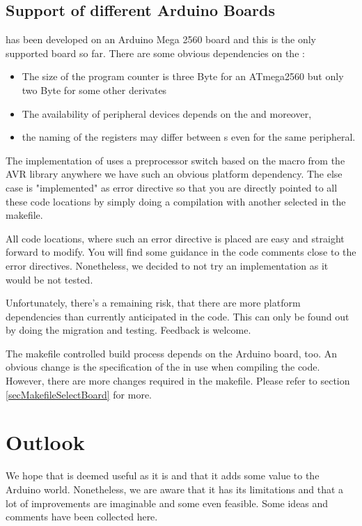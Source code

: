 \section{Support of different Arduino Boards}
\label{secArduinoBoards}

\rtos{} has been developed on an Arduino Mega 2560 board and this is the
only supported board so far. There are some obvious dependencies on the
\uC:
\begin{itemize}
  \item The size of the program counter is three Byte for an ATmega2560
    but only two Byte for some other derivates
  \item The availability of peripheral devices depends on the \uC{} and
    moreover,
  \item the naming of the registers may differ between \uC{}s even for the
    same peripheral.
\end{itemize}
The implementation of \rtos{} uses a preprocessor switch based on the
macro  from the AVR library anywhere we have
such an obvious platform dependency. The else case is "implemented" as
error directive so that you are directly pointed to all these code locations
by simply doing a compilation with another \uC{} selected in the makefile.

All code locations, where such an error directive is placed are easy and
straight forward to modify. You will find some guidance in the code
comments close to the error directives. Nonetheless, we decided to not try
an implementation as it would be not tested.

Unfortunately, there's a remaining risk, that there are more platform
dependencies than currently anticipated in the code. This can only be
found out by doing the migration and testing. Feedback is welcome.

The makefile controlled build process depends on the Arduino board, too.
An obvious change is the specification of the \uC{} in use when compiling
the code. However, there are more changes required in the makefile. Please
refer to section \ref{secMakefileSelectBoard} for more.


\chapter{Outlook}
\label{secOutlook}

We hope that \rtos{} is deemed useful as it is and that it adds some value
to the Arduino world. Nonetheless, we are aware that it has its limitations
and that a lot of improvements are imaginable and some even feasible. Some
ideas and comments have been collected here.

